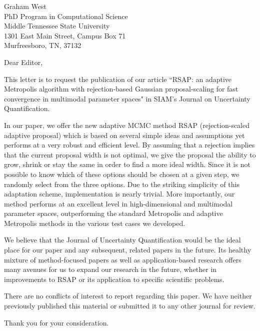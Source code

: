 \documentclass{letter}
\begin{document}
\begin{letter}{
Graham West \\
PhD Program in Computational Science \\
Middle Tennessee State University \\
1301 East Main Street, Campus Box 71 \\
Murfreesboro, TN, 37132
}

\begin{comment}

Questions:

Too much "simple" in second paragraph


\end{comment}

\opening{Dear Editor,}
This letter is to request the publication of our article ``RSAP: an adaptive Metropolis algorithm with rejection-based Gaussian proposal-scaling for fast convergence in multimodal parameter spaces" in SIAM's Journal on Uncertainty Quantification.

In our paper, we offer the new adaptive MCMC method RSAP (rejection-scaled adaptive proposal) which is based on several simple ideas and assumptions yet performs at a very robust and efficient level. By assuming that a rejection implies that the current proposal width is not optimal, we give the proposal the ability to grow, shrink or stay the same in order to find a more ideal width. Since it is not possible to know which of these options should be chosen at a given step, we randomly select from the three options. Due to the striking simplicity of this adaptation scheme, implementation is nearly trivial. More importantly, our method performs at an excellent level in high-dimensional and multimodal parameter spaces, outperforming the standard Metropolis and adaptive Metropolis methods in the various test cases we developed.

We believe that the Journal of Uncertainty Quantification would be the ideal place for our paper and any subsequent, related papers in the future. Its healthy mixture of method-focused papers as well as application-based research offers many avenues for us to expand our research in the future, whether in improvements to RSAP or its application to specific scientific problems.

There are no conflicts of interest to report regarding this paper. We have neither previously published this material or submitted it to any other journal for review. 

Thank you for your consideration.


\end{letter}
\end{document}
